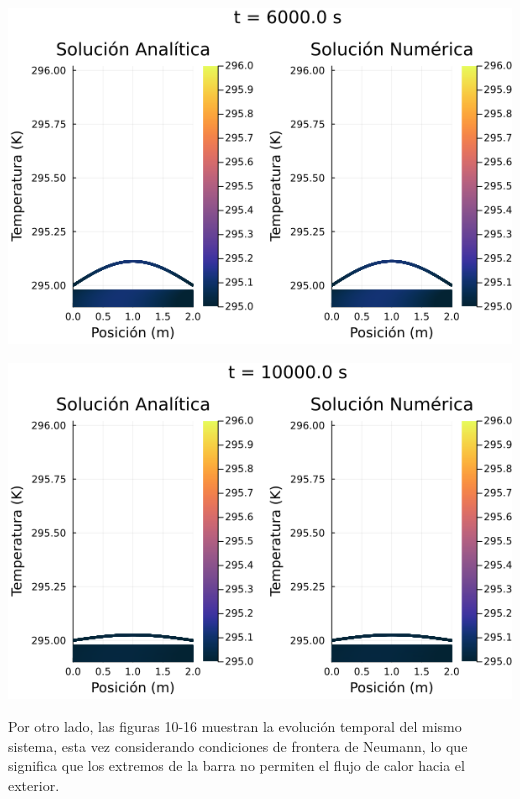 \documentclass[12pt]{article}
\begin{document}
\begin{center}
    \includegraphics[width=1\linewidth]{Ejemplo_01_t_4.png}
\end{center}

\begin{center}
    \includegraphics[width=1\linewidth]{Ejemplo_01_t_6.png}
\end{center}

Por otro lado, las figuras 10-16 muestran la evolución temporal del mismo sistema, esta vez considerando condiciones de frontera de Neumann, lo que significa que los extremos de la barra no permiten el flujo de calor hacia el exterior.
\end{document}

